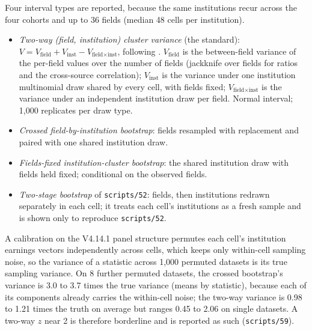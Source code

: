 \documentclass[11pt]{article}
\newcommand{\scr}[1]{\texttt{scripts/#1}}
\begin{document}
Four interval types are reported, because the same institutions recur across the four cohorts and up to 36
fields (median 48 cells per institution).
\begin{itemize}
\item \emph{Two-way (field, institution) cluster variance} (the standard): $V=V_{\text{field}}+V_{\text{inst}}-V_{\text{field}\times\text{inst}}$,
following \citet{cameron2011robust}. $V_{\text{field}}$ is the between-field variance of the per-field values
over the number of fields (jackknife over fields for ratios and the cross-source correlation); $V_{\text{inst}}$ is
the variance under one institution multinomial draw shared by every cell, with fields fixed; $V_{\text{field}\times\text{inst}}$
is the variance under an independent institution draw per field. Normal interval; 1,000 replicates per draw type.
\item \emph{Crossed field-by-institution bootstrap}: fields resampled with replacement and paired with one shared
institution draw.
\item \emph{Fields-fixed institution-cluster bootstrap}: the shared institution draw with fields held fixed;
conditional on the observed fields.
\item \emph{Two-stage bootstrap} of \scr{52}: fields, then institutions redrawn separately in each cell; it treats
each cell's institutions as a fresh sample and is shown only to reproduce \scr{52}.
\end{itemize}
A calibration on the V4.14.1 panel structure permutes each cell's institution earnings vectors independently
across cells, which keeps only within-cell sampling noise, so the variance of a statistic across 1,000 permuted
datasets is its true sampling variance. On 8 further permuted datasets, the crossed bootstrap's variance is 3.0 to
3.7 times the true variance (means by statistic), because each of its components already carries the within-cell
noise; the two-way variance is 0.98 to 1.21 times the truth on average but ranges 0.45 to 2.06 on single datasets.
A two-way $z$ near 2 is therefore borderline and is reported as such (\scr{59}).
\end{document}
